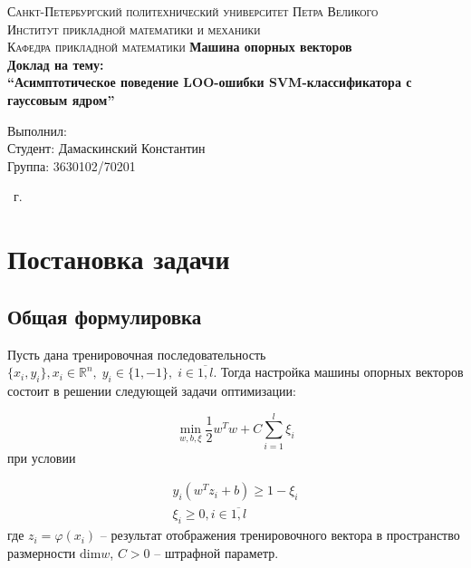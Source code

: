 \documentclass[14pt,a4paper,article]{ncc}
\numberwithin{equation}{subsection}
\begin{document}
\begin{titlepage}
    \begin{center}
        \textsc{
            Санкт-Петербургский политехнический университет Петра Великого \\[5mm]
            Институт прикладной математики и механики\\[2mm]
            Кафедра прикладной математики
        }   
        \vfill
        \textbf{\large
            Машина опорных векторов\\
            Доклад на тему: \\[3mm]
            ``Асимптотическое поведение LOO-ошибки SVM-классификатора с гауссовым ядром''
        }                
    \end{center}

    \vfill
    \hfill
    \begin{minipage}{0.5\textwidth}
        Выполнил: \\[2mm]   
		Студент: Дамаскинский Константин \\
		Группа: 3630102/70201\\
    \end{minipage}


    \vfill
    \begin{center}
        \theyear\ г.
    \end{center}
\end{titlepage}

\tableofcontents
\listoffigures
\listoftables
\newpage

\section{Постановка задачи}

\subsection{Общая формулировка}
Пусть дана тренировочная последовательность $\{x_i, y_i\}, x_i \in \mathbb{R}^n, \; y_i \in \{1, -1\}, \; i \in \overline{1,l}$. Тогда настройка машины опорных векторов состоит в решении следующей задачи оптимизации:

\begin{equation}
\min_{w, b, \xi} \frac{1}{2}w^Tw + C \displaystyle \sum_{i = 1}^{l}\xi_i
\end{equation}
при условии

\begin{align}
y_i(w^T z_i + b) \geq 1 - \xi_i \\
\xi_i \geq 0, i \in \overline{1,l}
\end{align}
где $z_i= \varphi(x_i)$ -- результат отображения тренировочного вектора в пространство размерности $\textrm{dim} w$, $C > 0$ -- штрафной параметр.
\end{document}
